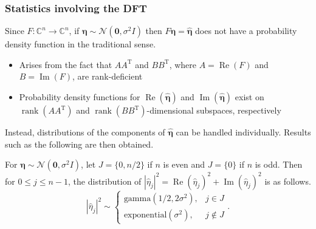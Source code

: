 \documentclass[t]{beamer}
\newcommand{\noise}{\eta}	%
\newcommand{\noiseSD}{\sigma}	%
\renewcommand{\Re}{\operatorname{Re}}	%
\renewcommand{\Im}{\operatorname{Im}}	%
\newcommand{\trans}{\mathrm{T}}	%
\DeclareMathOperator{\rank}{rank}	%
\newcommand{\noiseVec}{\mathbf{\noise}}	%
\begin{document}
\begin{frame}
\frametitle{Statistics involving the DFT}
Since $F : \mathbb{C}^n \rightarrow \mathbb{C}^n$, if $\mathbf{\noiseVec} \sim \mathcal{N}(\mathbf{0},\noiseSD^2 I)$ then $F\mathbf{\noiseVec} = \widehat{\mathbf{\noiseVec}}$ does not have a probability density function in the traditional sense.
\begin{itemize}
\item Arises from the fact that $AA^\trans$ and $BB^\trans$, where $A = \Re(F)$ and $B = \Im(F)$, are rank-deficient
\item Probability density functions for $\Re(\widehat{\mathbf{\noiseVec}})$ and $\Im(\widehat{\mathbf{\noiseVec}})$ exist on $\rank(AA^\trans)$ and $\rank(BB^\trans)$-dimensional subspaces, respectively \cite[p.~527-528]{Rao1973}
\end{itemize}
Instead, distributions of the components of $\widehat{\mathbf{\noiseVec}}$ can be handled individually. Results such as the following are then obtained.
\begin{block}{}
For $\noiseVec \sim \mathcal{N}(\mathbf{0},\noiseSD^2 I)$, let $J = \{0,n/2\}$ if $n$ is even and $J = \{0\}$ if $n$ is odd. Then for $0 \leq j \leq n-1$, the distribution of $|\widehat{\noise}_j|^2 = \Re(\widehat{\noise}_j)^2 + \Im(\widehat{\noise}_j)^2$ is as follows.
\[|\widehat{\noise}_j|^2 \sim \begin{cases}
\text{gamma}(1/2,2\noiseSD^2), & j \in J \\
\text{exponential}(\noiseSD^2), & j \not\in J \end{cases}.\]
\end{block}
\end{frame}
\end{document}
